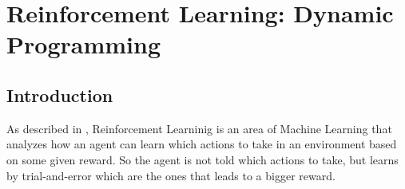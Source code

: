 \chapter{Reinforcement Learning: Dynamic Programming}

\section{Introduction}



As described in \citep{SuttonBarto}, Reinforcement Learninig is an area of Machine Learning that analyzes how an agent can learn which actions to take in an environment based on some given reward. So the agent is not told which actions to take, but learns by trial-and-error which are the ones that leads to a bigger reward.




